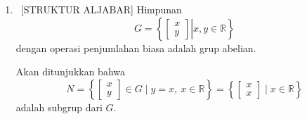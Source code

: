 \documentclass[10pt,a4paper]{article}
\begin{document}
\begin{enumerate}
        Untuk sistem (5.2),
        \[
          \begin{cases}
            835x+667y=168,\\
            333x+266y=66,
          \end{cases}
        \]
        diperoleh
        \[
          x=
          \frac{168(266)-667(66)}{-1}
          =
          \frac{666}{-1}
          =-666,
        \]
        dan
        \[
          y=
          \frac{835(66)-168(333)}{-1}
          =
          \frac{-834}{-1}
          =834.
        \]
        Jadi penyelesaian sistem (5.2) adalah
        \[
          \boxed{(x,y)=(-666,834).}
        \]

        Kedua sistem hampir sama, tetapi determinan matriks koefisiennya sangat kecil, yaitu $\Delta=-1$. Hal ini menunjukkan bahwa dua garis pada sistem tersebut hampir sejajar. Secara geometrik, perubahan kecil pada ruas kanan persamaan kedua, dari $67$ menjadi $66$, menggeser salah satu garis sedikit saja, tetapi karena kedua garis hampir sejajar, titik potongnya berpindah sangat jauh.

  \item \ [STRUKTUR ALJABAR]
        Himpunan
        \[
          G=\left\{
          \left.
          \begin{bmatrix}
            x\\y
          \end{bmatrix}
          \right| x,y\in\mathbb{R}
          \right\}
        \]
        dengan operasi penjumlahan biasa adalah grup abelian.

        Akan ditunjukkan bahwa
        \[
          N=
          \left\{
          \begin{bmatrix}
            x\\y
          \end{bmatrix}
          \in G \mid y=x,\ x\in\mathbb{R}
          \right\}
          =
          \left\{
          \begin{bmatrix}
            x\\x
          \end{bmatrix}
          \mid x\in\mathbb{R}
          \right\}
        \]
        adalah subgrup dari $G$.


\end{enumerate}
\end{document}
